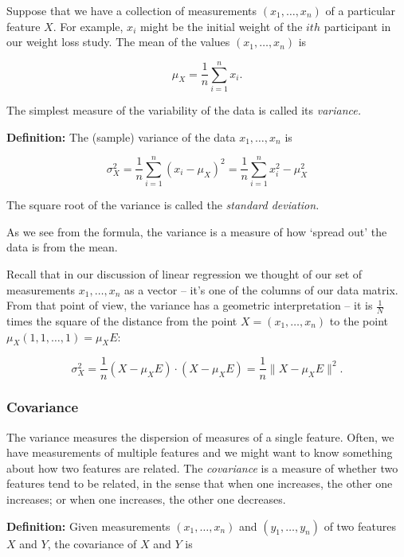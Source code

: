 \documentclass[
]{article}
\begin{document}
Suppose that we have a collection of measurements \((x_1,\ldots, x_n)\)
of a particular feature \(X\). For example, \(x_i\) might be the initial
weight of the \(ith\) participant in our weight loss study. The mean of
the values \((x_1,\ldots, x_n)\) is

\[
\mu_{X} = \frac{1}{n}\sum_{i=1}^{n} x_{i}.
\]

The simplest measure of the variability of the data is called its
\emph{variance.}

\textbf{Definition:} The (sample) variance of the data
\(x_1,\ldots, x_n\) is

\begin{equation}
\sigma_{X}^2 = \frac{1}{n}\sum_{i=1}^{n} (x_{i}-\mu_{X})^2 = \frac{1}{n}\sum_{i=1}^{n} x_{i}^2 - \mu_{X}^2
\label{eq:variance}\end{equation}

The square root of the variance is called the \emph{standard deviation.}

As we see from the formula, the variance is a measure of how `spread
out' the data is from the mean.

Recall that in our discussion of linear regression we thought of our set
of measurements \(x_1,\ldots, x_n\) as a vector -- it's one of the
columns of our data matrix. From that point of view, the variance has a
geometric interpretation -- it is \(\frac{1}{N}\) times the square of
the distance from the point \(X=(x_1,\ldots, x_n)\) to the point
\(\mu_{X}(1,1,\ldots,1)=\mu_{X}E\):

\begin{equation}
\sigma_{X}^2 = \frac{1}{n}(X-\mu_{X}E)\cdot(X-\mu_{X}E)  = \frac{1}{n}\|X-\mu_{X}E\|^2.
\label{eq:variancedot}\end{equation}

\hypertarget{covariance}{%
\subsubsection{Covariance}\label{covariance}}

The variance measures the dispersion of measures of a single feature.
Often, we have measurements of multiple features and we might want to
know something about how two features are related. The \emph{covariance}
is a measure of whether two features tend to be related, in the sense
that when one increases, the other one increases; or when one increases,
the other one decreases.

\textbf{Definition:} Given measurements \((x_1,\ldots, x_n)\) and
\((y_1,\ldots, y_n)\) of two features \(X\) and \(Y\), the covariance of
\(X\) and \(Y\) is
\end{document}
